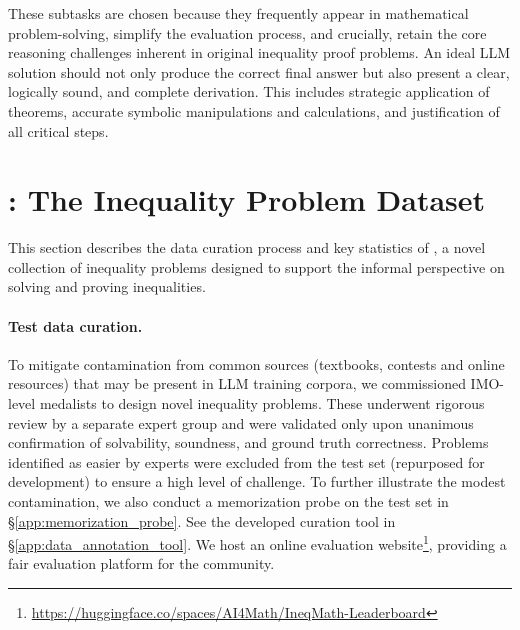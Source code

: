 \vspace{-1mm}

\vspace{-1mm}

These subtasks are chosen because they frequently appear in mathematical problem-solving, simplify the evaluation process, and crucially, retain the core reasoning challenges inherent in original inequality proof problems. An ideal LLM solution should not only produce the correct final answer but also present a clear, logically sound, and complete derivation. This includes strategic application of theorems, accurate symbolic manipulations and calculations, and justification of all critical steps.

\vspace{-2mm}
\section{\dataset: The Inequality Problem Dataset}
\label{sec:dataset}
\vspace{-2mm}

This section describes the data curation process and key statistics of \dataset, a novel collection of inequality problems designed to support the informal perspective on solving and proving inequalities. 

\vspace{-3mm}
\paragraph{Test data curation.} 
To mitigate contamination from common sources (textbooks, contests and online resources) that may be present in LLM training corpora, we commissioned IMO-level medalists to design novel inequality problems. These underwent rigorous review by a separate expert group and were validated only upon unanimous confirmation of solvability, soundness, and ground truth correctness. Problems identified as easier by experts were excluded from the test set (repurposed for development) to ensure a high level of challenge. To further illustrate the modest contamination, we also conduct a memorization probe on the test set in \S\ref{app:memorization_probe}. See the developed curation tool in \S\ref{app:data_annotation_tool}. We host an online evaluation website\footnote{\url{https://huggingface.co/spaces/AI4Math/IneqMath-Leaderboard}}, providing a fair evaluation platform for the community.

\vspace{-3mm}
